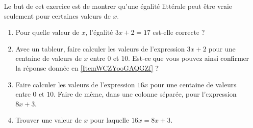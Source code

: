
\begin{exercice}\label{exo2smath-0230}

    Le but de cet exercice est de montrer qu'une égalité littérale peut être vraie seulement pour certaines valeurs de \( x\).
    \begin{enumerate}
        \item   \label{ItemWCZYooGAQGZf}
            Pour quelle valeur de \( x\), l'égalité \( 3x+2=17\) est-elle correcte ?
        \item
            Avec un tableur, faire calculer les valeurs de l'expression \( 3x+2\) pour une centaine de valeurs de \( x\) entre \( 0\) et \( 10\). Est-ce que vous pouvez ainsi confirmer la réponse donnée en \ref{ItemWCZYooGAQGZf} ?
        \item
            Faire calculer les valeurs de l'expression \( 16x\) pour une centaine de valeurs entre \( 0\) et \( 10\). Faire de même, dans une colonne séparée, pour l'expression \( 8x+3\).
        \item
            Trouver une valeur de \( x\) pour laquelle \( 16x=8x+3\).
    \end{enumerate}
\end{exercice}
